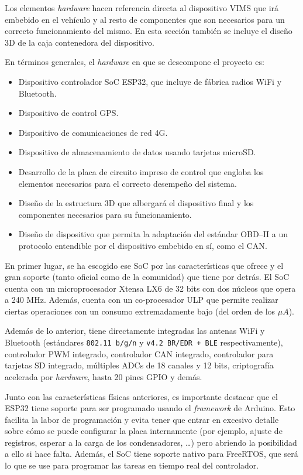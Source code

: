 Los elementos \textit{hardware} hacen referencia directa al dispositivo \ac{VIMS}
que irá embebido en el vehículo y al resto de componentes que son necesarios para
un correcto funcionamiento del mismo. En esta sección también se incluye el
diseño 3D de la caja contenedora del dispositivo.

En términos generales, el \textit{hardware} en que se descompone el proyecto es:

\begin{itemize}
  \item Dispositivo controlador \ac{SoC} ESP32, que incluye de fábrica radios WiFi y Bluetooth.
  \item Dispositivo de control \ac{GPS}.
  \item Dispositivo de comunicaciones de red 4G.
  \item Dispositivo de almacenamiento de datos usando tarjetas microSD.
  \item Desarrollo de la placa de circuito impreso de control que engloba los elementos
        necesarios para el correcto desempeño del sistema.
  \item Diseño de la estructura 3D que albergará el dispositivo final y los componentes
        necesarios para su funcionamiento.
  \item Diseño de dispositivo que permita la adaptación del estándar \ac{OBD}--II a
        un protocolo entendible por el dispositivo embebido en sí, como el \ac{CAN}.
\end{itemize}

En primer lugar, se ha escogido ese \ac{SoC} por las características que
ofrece y el gran soporte (tanto oficial como de la comunidad) que tiene por detrás.
El \ac{SoC} cuenta con un microprocesador Xtensa LX6 de 32 bits con dos
núcleos que opera a 240 MHz. Además, cuenta con un co-procesador \ac{ULP} que permite realizar
ciertas operaciones con un consumo extremadamente bajo (del orden de los $\mu A$).

Además de lo anterior, tiene directamente integradas las antenas WiFi y Bluetooth
(estándares \texttt{802.11 b/g/n} y \texttt{v4.2 \ac{BR/EDR} + \ac{BLE}} respectivamente),
controlador \ac{PWM} integrado, controlador \ac{CAN} integrado, controlador para
tarjetas SD integrado, múltiples \ac{ADC}s de 18 canales y 12 bits,
criptografía acelerada por \textit{hardware}, hasta 20 pines \ac{GPIO} y demás.

Junto con las características físicas anteriores, es importante destacar que el
ESP32 tiene soporte para ser programado usando el \textit{framework} de Arduino.
Esto facilita la labor de programación y evita tener que entrar
en excesivo detalle sobre cómo se puede configurar la placa internamente
(por ejemplo, ajuste de registros, esperar a la carga de los condensadores, \dots)
pero abriendo la posibilidad a ello si hace falta. Además, el \ac{SoC} tiene
soporte nativo para FreeRTOS, que será lo que se use para programar las tareas
en tiempo real del controlador.


